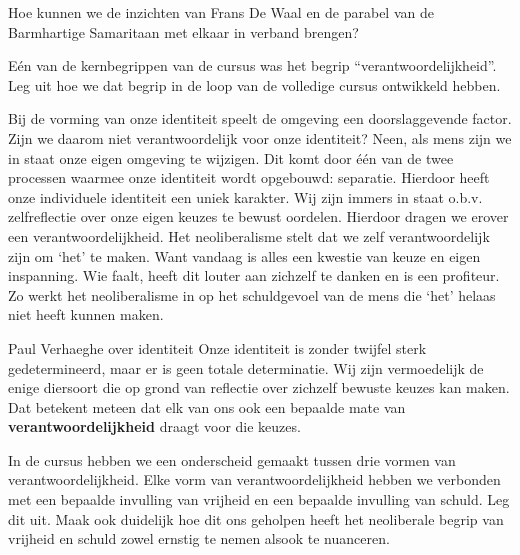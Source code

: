 \documentclass[main.tex]{subfiles}
\begin{document}
\begin{examenvraag}
    \begin{vraag}
        Hoe kunnen we de inzichten van Frans De Waal en de parabel van de Barmhartige Samaritaan met elkaar in verband brengen?
    \end{vraag}

    \begin{antwoord}
    \end{antwoord}
\end{examenvraag}


\begin{examenvraag}
    \begin{vraag}
        Eén van de kernbegrippen van de cursus was het begrip “verantwoordelijkheid”. Leg uit hoe we dat begrip in de loop van de volledige cursus ontwikkeld hebben.
    \end{vraag}

    \begin{antwoord}
	Bij de vorming van onze identiteit speelt de omgeving een doorslaggevende factor.‭ ‬Zijn we 
	daarom niet verantwoordelijk voor onze identiteit‭? ‬Neen,‭ ‬als mens zijn we in staat onze eigen 
	omgeving te wijzigen.‭ ‬Dit komt door één van de‭ ‬twee processen waarmee onze identiteit wordt 
	opgebouwd:‭ ‬separatie.‭ ‬Hierdoor heeft onze individuele identiteit een uniek karakter.‭ ‬Wij zijn 
	immers in staat o.b.v.‭ ‬zelfreflectie over onze eigen keuzes te bewust oordelen.‭ ‬Hierdoor dragen 
	we erover een verantwoordelijkheid.‭
	‬Het neoliberalisme stelt dat we zelf verantwoordelijk zijn om‭ ‬‘het‭’‬ te maken.‭ ‬Want vandaag is 
	alles een kwestie van keuze en eigen inspanning.‭ ‬Wie faalt,‭ ‬heeft dit louter aan zichzelf te 
	danken en is een profiteur.‭ ‬Zo werkt het neoliberalisme in op het schuldgevoel van de mens die‭ 
	‬‘het‭’‬ helaas niet heeft kunnen maken.
    \end{antwoord}
    \begin{citaat}{Paul Verhaeghe over identiteit}
    Onze
identiteit is zonder twijfel sterk gedetermineerd, maar er is geen totale determinatie. Wij zijn
vermoedelijk de enige diersoort die op grond van reflectie over zichzelf bewuste keuzes kan maken.
Dat betekent meteen dat elk van ons ook een bepaalde mate van \textbf{verantwoordelijkheid} draagt voor die
keuzes. 
    \end{citaat}
\end{examenvraag}


\begin{examenvraag}
    \begin{vraag}
        In de cursus hebben we een onderscheid gemaakt tussen drie vormen van verantwoordelijkheid. Elke vorm van verantwoordelijkheid hebben we verbonden met een bepaalde invulling van vrijheid en een bepaalde invulling van schuld. Leg dit uit. Maak ook duidelijk hoe dit ons geholpen heeft het neoliberale begrip van vrijheid en schuld zowel ernstig te nemen alsook te nuanceren.
    \end{vraag}

    \begin{antwoord}
    \end{antwoord}
\end{examenvraag}
\end{document}
